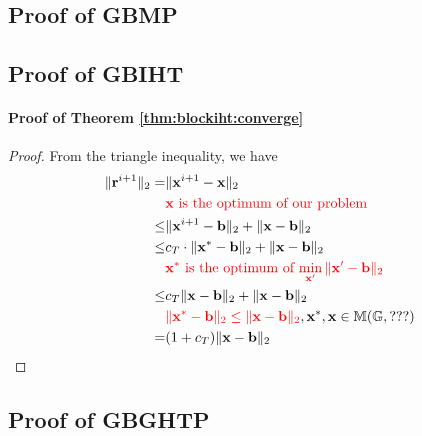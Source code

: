 \documentclass{article}
\begin{document}
\subsection{Proof of GBMP}

\subsection{Proof of GBIHT}

\paragraph{Proof of Theorem \ref{thm:blockiht:converge}}
\begin{proof}
From the triangle inequality, we have
\begin{align*}
\|{\bf r}^{i+1}\|_2=&\|{\bf x}^{i+1}-{\bf x}\|_2\\
&\text{\color{red}{${\bf x}$ is the optimum of our problem}}\\
\leq&\|{\bf x}^{i+1}-{\bf b}\|_2+\|{\bf x}-{\bf b}\|_2\\
\leq&c_T\cdot\|{\bf x}^*-{\bf b}\|_2+\|{\bf x}-{\bf b}\|_2\\
&\text{\color{red}{${\bf x}^*$ is the optimum of $\min_{{\bf x}'}\|{\bf x}'-{\bf b}\|_2$}}\\ 
\leq&c_T\|{\bf x}-{\bf b}\|_2+\|{\bf x}-{\bf b}\|_2\\
&{\color{red}{\|{\bf x}^*-{\bf b}\|_2\leq\|{\bf x}-{\bf b}\|_2}}, {\bf x}^*, {\bf x}\in\mathbb{M}(\mathbb{G}, ???)\\
=&(1+c_T)\|{\bf x}-{\bf b}\|_2
\end{align*}
\end{proof}

\subsection{Proof of GBGHTP}



\end{document}
